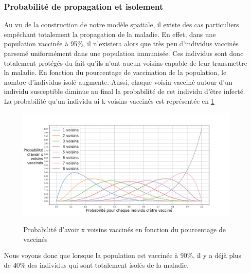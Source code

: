 \documentclass[journal, a4paper]{IEEEtran}
\begin{document}
	\subsubsection{Probabilité de propagation et isolement}
	Au vu de la construction de notre modèle spatiale, il existe des cas particuliers empêchant totalement la propagation de la maladie. En effet, dans une population vaccinée à 95\%, il n'existera alors que très peu d'individus vaccinés parsemé uniformément dans une population immunisée. Ces individus sont donc totalement protégés du fait qu'ils n'ont aucun voisins capable de leur transmettre la maladie. En fonction du pourcentage de vaccination de la population, le nombre d'individus isolé augmente.
	Aussi, chaque voisin vacciné autour d'un individu susceptible diminue au final la probabilité de cet individu d'être infecté.
	La probabilité qu'un individu ai k voisins vaccinés est représentée en \ref{fig:probNeighbour}
	\begin{figure}
		\caption{Probabilité d'avoir x voisins vaccinés en fonction du pourcentage de vaccinés}
		\includegraphics[scale=0.2]{probNeighbour}
		\label{fig:probNeighbour}
	\end{figure}
	Nous voyons donc que lorsque la population est vaccinée à 90\%, il y a déjà plus de 40\% des individus qui sont totalement isolés de la maladie.
\end{document}
